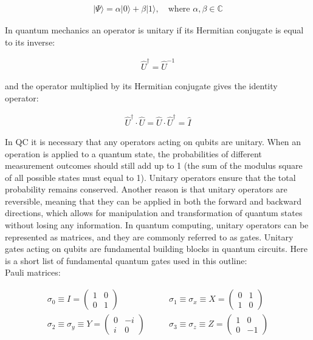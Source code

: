 \documentclass[twoside,twocolumn,9pt]{article}
\begin{document}
\begin{align}
  |\Psi\rangle = \alpha|0\rangle + \beta|1\rangle, \quad \text{where } \alpha, \beta \in \mathbb{C}
\end{align}

In quantum mechanics an operator is unitary if its Hermitian conjugate is equal to its inverse:

\begin{align}
\hat{U}^{\dagger}=\hat{U}^{-1}
\end{align}

and the operator multiplied by its Hermitian conjugate gives the identity operator:

\begin{align}
  \hat{U}^{\dagger}\cdot\hat{U}=\hat{U}\cdot\hat{U}^{\dagger}=\hat{I}
  \end{align}

In QC it is necessary that any operators acting on qubits are unitary. When an operation is applied to a quantum state, the probabilities of different measurement outcomes should still add up to 1 (the sum of the modulus square of all possible states must equal to 1). Unitary operators ensure that the total probability remains conserved. Another reason is that unitary operators are reversible, meaning that they can be applied in both the forward and backward directions, which allows for manipulation and transformation of quantum states without losing any information. In quantum computing, unitary operators can be represented as matrices, and they are commonly referred to as gates. Unitary gates acting on qubits are fundamental building blocks in quantum circuits.
Here is a short list of fundamental quantum gates used in this outline:\\
Pauli matrices:

\begin{equation}
  \begin{split}
    \sigma_0\equiv I=\begin{pmatrix}
      1 & 0 \\
      0 & 1
    \end{pmatrix} \quad&\quad
    \sigma_1\equiv\sigma_x\equiv X=\begin{pmatrix}
      0 & 1 \\
      1 & 0
    \end{pmatrix} \\
    \sigma_2\equiv\sigma_y\equiv Y=\begin{pmatrix}
      0 & -i \\
      i & 0
    \end{pmatrix} \quad&\quad
    \sigma_3\equiv\sigma_z\equiv Z=\begin{pmatrix}
      1 & 0 \\
      0 & -1
    \end{pmatrix}
  \end{split}
  \end{equation}
\end{document}
